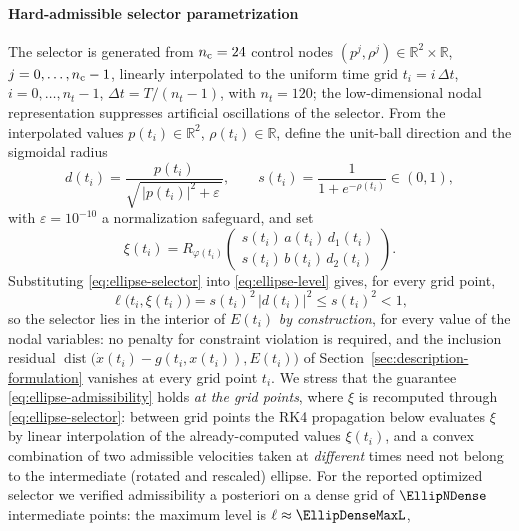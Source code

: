 \documentclass[11pt]{elsarticle}
\theoremstyle{definition}
\theoremstyle{remark}
\numberwithin{equation}{section}
\def\dist{\operatorname{dist}}
\begin{document}
\paragraph{Hard-admissible selector parametrization}
The selector is generated from $n_{\rm c}=24$ control nodes
$(p^j,\rho^j)\in\mathbb{R}^2\times\mathbb{R}$, $j=0,\dots,n_{\rm c}-1$,
linearly interpolated to the uniform time grid
$t_i=i\,\Delta t$, $i=0,\dots,n_t-1$, $\Delta t=T/(n_t-1)$, with
$n_t=120$; the low-dimensional nodal representation suppresses
artificial oscillations of the selector. From the interpolated values
$p(t_i)\in\mathbb{R}^2$, $\rho(t_i)\in\mathbb{R}$, define the unit-ball
direction and the sigmoidal radius
\begin{equation}
	\label{eq:ellipse-dir-radius}
	d(t_i)=\frac{p(t_i)}{\sqrt{\,|p(t_i)|^2+\varepsilon\,}},
	\qquad
	s(t_i)=\frac{1}{1+e^{-\rho(t_i)}}\in(0,1),
\end{equation}
with $\varepsilon=10^{-10}$ a normalization safeguard, and set
\begin{equation}
	\label{eq:ellipse-selector}
	\xi(t_i)
	=R_{\varphi(t_i)}
	\begin{pmatrix}
		s(t_i)\,a(t_i)\,d_1(t_i)\\
		s(t_i)\,b(t_i)\,d_2(t_i)
	\end{pmatrix}.
\end{equation}
Substituting \eqref{eq:ellipse-selector} into
\eqref{eq:ellipse-level} gives, for every grid point,
\begin{equation}
	\label{eq:ellipse-admissibility}
	\ell\bigl(t_i,\xi(t_i)\bigr)
	=s(t_i)^2\,|d(t_i)|^2
	\le s(t_i)^2<1,
\end{equation}
so the selector lies in the interior of $E(t_i)$ \emph{by construction},
for every value of the nodal variables: no penalty for constraint
violation is required, and the inclusion residual
$\dist\bigl(\dot x(t_i)-g(t_i,x(t_i)),E(t_i)\bigr)$ of
Section~\ref{sec:description-formulation} vanishes at every grid point
$t_i$. We stress that the guarantee \eqref{eq:ellipse-admissibility}
holds \emph{at the grid points}, where $\xi$ is recomputed through
\eqref{eq:ellipse-selector}: between grid points the RK4 propagation
below evaluates $\xi$ by linear interpolation of the already-computed
values $\xi(t_i)$, and a convex combination of two admissible velocities
taken at \emph{different} times need not belong to the intermediate
(rotated and rescaled) ellipse. For the reported optimized selector we
verified admissibility a posteriori on a dense grid of $\EllipNDense$
intermediate points: the maximum level is $\ell\approx\EllipDenseMaxL$,
\end{document}
